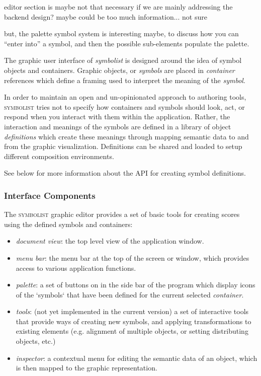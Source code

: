 \documentclass{article}
\def\symbolist{\textsc{symbolist}\xspace}
\begin{document}
editor section is maybe not that necessary if we are mainly addressing the backend design?
maybe could be too much information... not sure

but, the palette symbol system is interesting maybe, to discuss how you can ``enter into'' a symbol, and then the possible sub-elements populate the palette.


The graphic user interface of \textit{symbolist} is designed around the idea of symbol objects and containers. Graphic objects, or \textit{symbols} are placed in \textit{container} references which define a framing used to interpret the meaning of the \textit{symbol}.

In order to maintain an open and un-opinionated approach to authoring tools, \symbolist tries not to specify how containers and symbols should look, act, or respond when you interact with them within the application. Rather, the interaction and meanings of the symbols are defined in a library of object \textit{definitions} which create these meanings through mapping semantic data to and from the graphic visualization. Definitions can be shared and loaded to setup different composition environments.

See below for more information about the API for creating symbol definitions. 

\subsubsection{Interface Components}\label{subsec:interface_components}

The \symbolist graphic editor provides a set of basic tools for creating scores using the defined symbols and containers:
\begin{itemize}\itemsep0pt %
\item \textit{document view}: the top level view of the application window.
\item \textit{menu bar}: the menu bar at the top of the screen or window, which provides access to various application functions.
\item \textit{palette}: a set of buttons on in the side bar of the program which display icons of the `symbols` that have been defined for the current selected \textit{container}. 
\item \textit{tools}: (not yet implemented in the current version) a set of interactive tools that provide ways of creating new symbols, and applying transformations to existing elements (e.g. alignment of multiple objects, or setting distributing objects, etc.)
\item \textit{inspector}: a contextual menu for editing the semantic data of an object, which is then mapped to the graphic representation.
\end{itemize}
\end{document}
